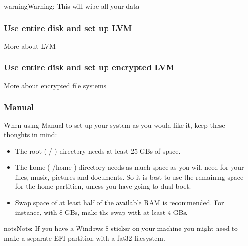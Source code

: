 \documentclass[letterpaper,10pt,english]{sphinxmanual}
\begin{document}
\begin{notice}{warning}{Warning:}
This will wipe all your data
\end{notice}


\subsubsection{Use entire disk and set up LVM}
\label{docs/installation:use-entire-disk-and-set-up-lvm}
More about \href{https://wiki.ubuntu.com/Lvm}{LVM}


\subsubsection{Use entire disk and set up encrypted LVM}
\label{docs/installation:use-entire-disk-and-set-up-encrypted-lvm}
More about \href{https://help.ubuntu.com/community/EncryptedFilesystems}{encrypted file systems}


\subsubsection{Manual}
\label{docs/installation:manual}

When using Manual to set up your system as you would like it, keep these thoughts in mind:
\begin{itemize}
\item {} 
The root ( / ) directory needs at least 25 GBs of space.

\item {} 
The home ( /home ) directory needs as much space as you will need for your files, music, pictures and documents.
So it is best to use the remaining space for the home partition, unless you have going to dual boot.

\item {} 
Swap space of at least half of the available RAM is recommended. For instance, with 8 GBs, make the swap with at least 4 GBs.

\end{itemize}

\begin{notice}{note}{Note:}
If you have a Windows 8 sticker on your machine you might need to make a separate EFI partition with a fat32 filesystem.
\end{notice}
\end{document}
